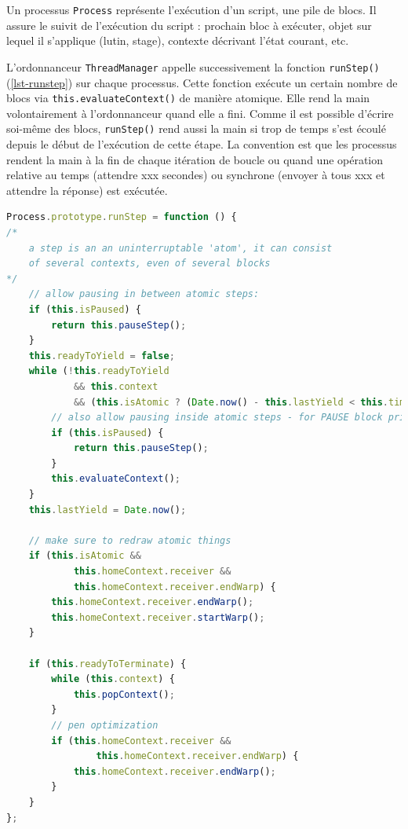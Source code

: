 Un processus \texttt{Process} représente l'exécution d'un script, une pile de blocs. Il assure le suivit de l'exécution du script : prochain bloc à exécuter, objet sur lequel il s'applique (lutin, stage), contexte décrivant l'état courant, etc.

L'ordonnanceur \texttt{ThreadManager} appelle successivement la fonction \texttt{runStep()} (\ref{lst-runstep}) sur chaque processus. Cette fonction exécute un certain nombre de blocs via \texttt{this.evaluateContext()} de manière atomique. Elle rend la main volontairement à l'ordonnanceur quand elle a fini. Comme il est possible d'écrire soi-même des blocs, \texttt{runStep()} rend aussi la main si trop de temps s'est écoulé depuis le début de l'exécution de cette étape. La convention est que les processus rendent la main à la fin de chaque itération de boucle ou quand une opération relative au temps (attendre xxx secondes) ou synchrone (envoyer à tous xxx et attendre la réponse) est exécutée.

\begin{lstlisting}[caption={Fonction \texttt{runStep()} de \texttt{Process}},label=lst-runstep,language=JavaScript]
Process.prototype.runStep = function () {
/*
    a step is an an uninterruptable 'atom', it can consist
    of several contexts, even of several blocks
*/
    // allow pausing in between atomic steps:
    if (this.isPaused) {
        return this.pauseStep();
    }
    this.readyToYield = false;
    while (!this.readyToYield
            && this.context
            && (this.isAtomic ? (Date.now() - this.lastYield < this.timeout) : true) ) {
        // also allow pausing inside atomic steps - for PAUSE block primitive:
        if (this.isPaused) {
            return this.pauseStep();
        }
        this.evaluateContext();
    }
    this.lastYield = Date.now();

    // make sure to redraw atomic things
    if (this.isAtomic &&
            this.homeContext.receiver &&
            this.homeContext.receiver.endWarp) {
        this.homeContext.receiver.endWarp();
        this.homeContext.receiver.startWarp();
    }

    if (this.readyToTerminate) {
        while (this.context) {
            this.popContext();
        }
        // pen optimization
        if (this.homeContext.receiver &&
                this.homeContext.receiver.endWarp) {
            this.homeContext.receiver.endWarp();
        }
    }
};
\end{lstlisting}



